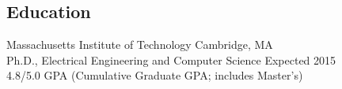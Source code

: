 \documentclass[margin]{res}
\begin{document}
\begin{resume}

\section{Education} 
Massachusetts Institute of Technology \hfill Cambridge, MA \\
Ph.D., Electrical Engineering and Computer Science \hfill Expected 2015\\
4.8/5.0 GPA (Cumulative Graduate GPA; includes Master's)


\end{resume}
\end{document}
